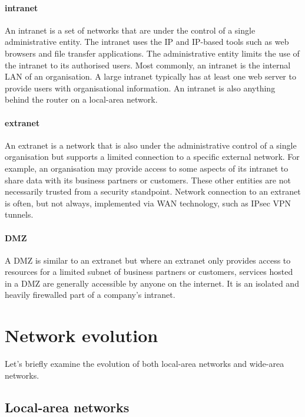 {\paragraph{intranet}
An intranet is a set of networks that are under the control of a single administrative entity.
The intranet uses the \gls{IP} and \gls{IP}-based tools such as web browsers and file transfer applications.
The administrative entity limits the use of the intranet to its authorised users.
Most commonly, an intranet is the internal \gls{LAN} of an organisation.
A large intranet typically has at least one web server to provide users with organisational information.
An intranet is also anything behind the router on a local-area network.

\paragraph{extranet}
An extranet is a network that is also under the administrative control of a single organisation but supports a limited connection to a specific external network.
For example, an organisation may provide access to some aspects of its intranet to share data with its business partners or customers.
These other entities are not necessarily trusted from a security standpoint.
Network connection to an extranet is often, but not always, implemented via \gls{WAN} technology, such as IPsec \acs{VPN} tunnels.

\paragraph{\gls{DMZ}}
A \gls{DMZ} is similar to an extranet but where an extranet only provides access to resources for a limited subnet of business partners or customers, services hosted in a \gls{DMZ} are generally accessible by anyone on the internet.
It is an isolated and heavily firewalled part of a company's intranet.

\section{Network evolution}
\label{sec:network-evolution}

Let's briefly examine the evolution of both local-area networks and wide-area networks.

\subsection{Local-area networks}
\label{sec:network-evolution-lan}

}
